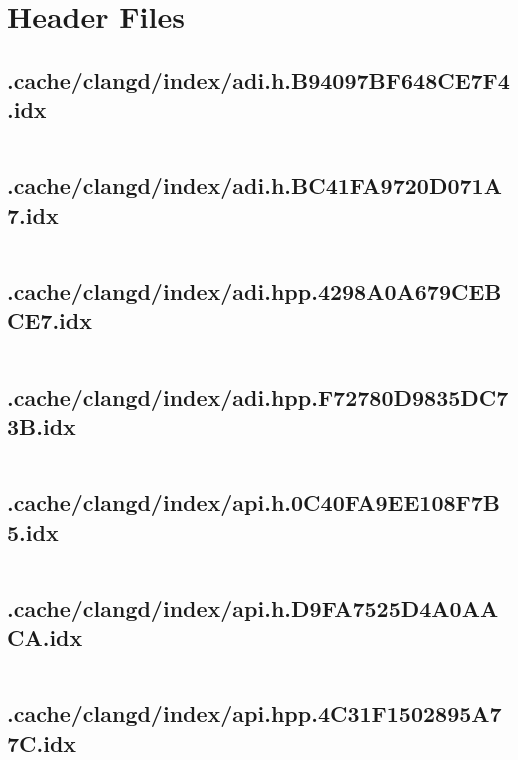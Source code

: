\section{Header Files}

\subsection{.cache/clangd/index/adi.h.B94097BF648CE7F4.idx}
\inputminted[linenos,tabsize=2,breaklines, breakanywhere]{c}{adi.h.B94097BF648CE7F4.idx}
\pagebreak

\subsection{.cache/clangd/index/adi.h.BC41FA9720D071A7.idx}
\inputminted[linenos,tabsize=2,breaklines, breakanywhere]{c}{adi.h.BC41FA9720D071A7.idx}
\pagebreak

\subsection{.cache/clangd/index/adi.hpp.4298A0A679CEBCE7.idx}
\inputminted[linenos,tabsize=2,breaklines, breakanywhere]{c}{adi.hpp.4298A0A679CEBCE7.idx}
\pagebreak

\subsection{.cache/clangd/index/adi.hpp.F72780D9835DC73B.idx}
\inputminted[linenos,tabsize=2,breaklines, breakanywhere]{c}{adi.hpp.F72780D9835DC73B.idx}
\pagebreak

\subsection{.cache/clangd/index/api.h.0C40FA9EE108F7B5.idx}
\inputminted[linenos,tabsize=2,breaklines, breakanywhere]{c}{api.h.0C40FA9EE108F7B5.idx}
\pagebreak

\subsection{.cache/clangd/index/api.h.D9FA7525D4A0AACA.idx}
\inputminted[linenos,tabsize=2,breaklines, breakanywhere]{c}{api.h.D9FA7525D4A0AACA.idx}
\pagebreak

\subsection{.cache/clangd/index/api.hpp.4C31F1502895A77C.idx}
\inputminted[linenos,tabsize=2,breaklines, breakanywhere]{c}{api.hpp.4C31F1502895A77C.idx}
\pagebreak

